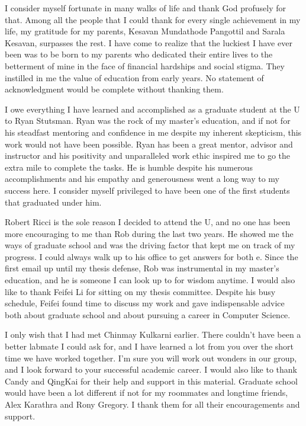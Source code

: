 I consider myself fortunate in many walks of life and thank God profusely for that. Among all the people that I could thank for every single achievement in my life, my gratitude for my parents, Kesavan Mundathode Pangottil
and Sarala Kesavan, surpasses the rest. I have come to realize that the luckiest I have ever been was to be born to my parents who dedicated their entire lives to the betterment of mine in the face of financial hardships and social stigma. They instilled in me the value of education from early years. No statement of acknowledgment would be complete without thanking them.

I owe everything I have learned and accomplished as a graduate student at the U to Ryan Stutsman. Ryan was the rock of my master's education, and if not for his steadfast mentoring and confidence in me despite my inherent skepticism, this work would not have been possible. Ryan has been a great mentor, advisor and instructor and his positivity and unparalleled work ethic inspired me to go the extra mile to complete the tasks. He is humble despite his numerous accomplishments and his empathy and generousness went a long way to my success here. I consider myself privileged to have been one of the first students that graduated under him.

Robert Ricci is the sole reason I decided to attend the U, and no one has been more encouraging to me than Rob during the last two years. He showed me the ways of graduate school and
was the driving factor that kept me on track of my progress. I could always walk up to his office to get answers for both e. Since the first email up until my thesis defense, Rob was instrumental in my master's education, and he is someone I can look up to for wisdom anytime. I would also like to thank Feifei Li for sitting on my thesis committee. Despite his busy schedule, Feifei found time to discuss my work and gave indispensable advice both about graduate school and about pursuing a career in Computer Science.

I only wish that I had met Chinmay Kulkarni earlier. There couldn't have been a better labmate I could ask for, and  I have learned a lot from you over the short time we have worked together. I'm sure you will work out wonders in our group, and I look forward to your successful academic career. I would also like to thank Candy and QingKai for their help and support in this material. Graduate school would have been a lot different if not for my roommates and longtime friends, Alex Karathra and Rony Gregory. I thank them for all their encouragements and support.

